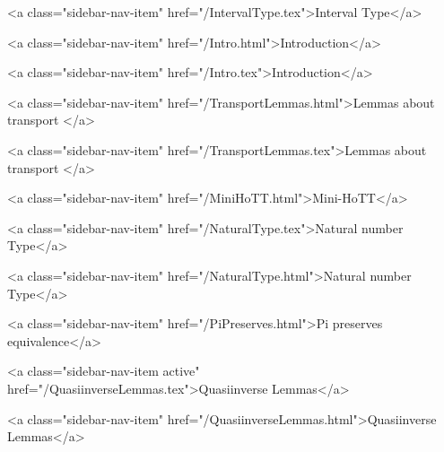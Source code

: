       
        
          <a class="sidebar-nav-item" href="/IntervalType.tex">Interval Type</a>
        
      
    
      
        
          <a class="sidebar-nav-item" href="/Intro.html">Introduction</a>
        
      
    
      
        
          <a class="sidebar-nav-item" href="/Intro.tex">Introduction</a>
        
      
    
      
        
          <a class="sidebar-nav-item" href="/TransportLemmas.html">Lemmas about transport </a>
        
      
    
      
        
          <a class="sidebar-nav-item" href="/TransportLemmas.tex">Lemmas about transport </a>
        
      
    
      
        
          <a class="sidebar-nav-item" href="/MiniHoTT.html">Mini-HoTT</a>
        
      
    
      
        
          <a class="sidebar-nav-item" href="/NaturalType.tex">Natural number Type</a>
        
      
    
      
        
          <a class="sidebar-nav-item" href="/NaturalType.html">Natural number Type</a>
        
      
    
      
        
          <a class="sidebar-nav-item" href="/PiPreserves.html">Pi preserves equivalence</a>
        
      
    
      
        
          <a class="sidebar-nav-item active" href="/QuasiinverseLemmas.tex">Quasiinverse Lemmas</a>
        
      
    
      
        
          <a class="sidebar-nav-item" href="/QuasiinverseLemmas.html">Quasiinverse Lemmas</a>
        
